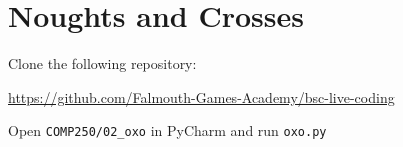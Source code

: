 \part{Noughts and Crosses}
\frame{\partpage}

\begin{frame}
	\begin{center}
		Clone the following repository:
		
		\vspace{1ex}
		
		\url{https://github.com/Falmouth-Games-Academy/bsc-live-coding}

		\vspace{1ex}

		Open \texttt{COMP250/02\_oxo} in PyCharm and run \texttt{oxo.py}
	\end{center}
\end{frame}
